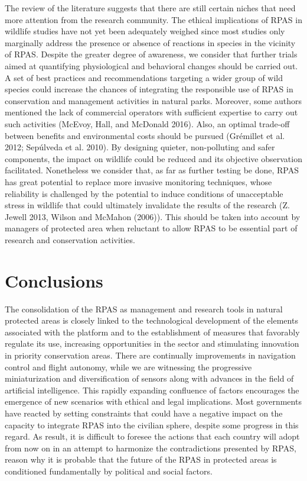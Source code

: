 \documentclass[]{interact}
\theoremstyle{plain}%
\theoremstyle{definition}
\theoremstyle{remark}
\begin{document}
The review of the literature suggests that there are still certain
niches that need more attention from the research community. The ethical
implications of RPAS in wildlife studies have not yet been adequately
weighed since most studies only marginally address the presence or
absence of reactions in species in the vicinity of RPAS. Despite the
greater degree of awareness, we consider that further trials aimed at
quantifying physiological and behavioral changes should be carried out.
A set of best practices and recommendations targeting a wider group of
wild species could increase the chances of integrating the responsible
use of RPAS in conservation and management activities in natural parks.
Moreover, some authors mentioned the lack of commercial operators with
sufficient expertise to carry out such activities (McEvoy, Hall, and
McDonald 2016). Also, an optimal trade-off between benefits and
environmental costs should be pursued (Grémillet et al. 2012; Sepúlveda
et al. 2010). By designing quieter, non-polluting and safer components,
the impact on wildlife could be reduced and its objective observation
facilitated. Nonetheless we consider that, as far as further testing be
done, RPAS has great potential to replace more invasive monitoring
techniques, whose reliability is challenged by the potential to induce
conditions of unacceptable stress in wildlife that could ultimately
invalidate the results of the research (Z. Jewell 2013, Wilson and
McMahon (2006)). This should be taken into account by managers of
protected area when reluctant to allow RPAS to be essential part of
research and conservation activities.

\section{Conclusions}\label{conclusions}

The consolidation of the RPAS as management and research tools in
natural protected areas is closely linked to the technological
development of the elements associated with the platform and to the
establishment of measures that favorably regulate its use, increasing
opportunities in the sector and stimulating innovation in priority
conservation areas. There are continually improvements in navigation
control and flight autonomy, while we are witnessing the progressive
miniaturization and diversification of sensors along with advances in
the field of artificial intelligence. This rapidly expanding confluence
of factors encourages the emergence of new scenarios with ethical and
legal implications. Most governments have reacted by setting constraints
that could have a negative impact on the capacity to integrate RPAS into
the civilian sphere, despite some progress in this regard. As result, it
is difficult to foresee the actions that each country will adopt from
now on in an attempt to harmonize the contradictions presented by RPAS,
reason why it is probable that the future of the RPAS in protected areas
is conditioned fundamentally by political and social factors.
\end{document}
